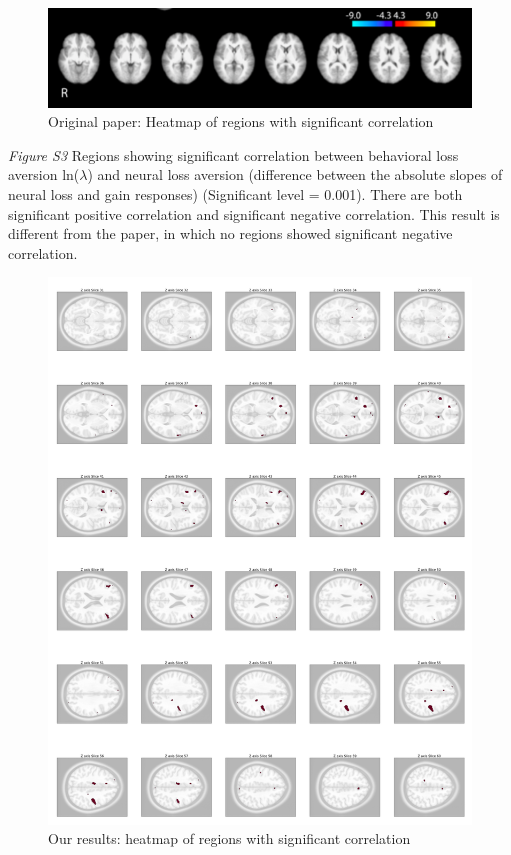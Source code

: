\documentclass[11pt]{article}
\begin{document}
\begin{figure}[H]
    \centering
        \includegraphics[scale=0.5]{figures/Regression3/Orig_sig_cor_z_gain.png}
    \caption{Original paper: Heatmap of regions with significant correlation}
\end{figure}

\newpage

\emph{Figure S3} Regions showing significant correlation between behavioral loss aversion ln($\lambda$) and neural loss aversion (difference between the absolute slopes of neural loss and gain responses) (Significant level = 0.001). There are both significant positive correlation and significant negative correlation. This result is different from the paper, in which no regions showed significant negative correlation.

\begin{figure}[H]
    \centering
        \includegraphics[scale=0.105]{figures/Regression3/sig_cor_z_neural_aversion.png}
    \caption{Our results: heatmap of regions with significant correlation}
\end{figure}
\end{document}
